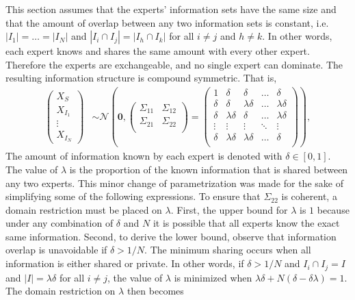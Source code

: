 \documentclass[11pt]{article}
\theoremstyle{definition}
\theoremstyle{definition}
\begin{document}
This section assumes that the experts' information sets have the same size and that the amount of overlap between any two information sets is constant, i.e.  $|I_{1}| =  \dots = |I_{N}|$ and $|I_{i} \cap I_{j}| = |I_{h} \cap I_{k}|$ for all $i \neq j$ and $h \neq k$. In other words, each expert knows and shares the same amount with every other expert. Therefore the experts are exchangeable, and no single expert can dominate. The resulting information structure is compound symmetric. That is,
\begin{align*}
\left(\begin{matrix} X_{S} \\ X_{I_1}\\ \vdots \\ X_{I_N} \end{matrix}\right) &\sim \mathcal{N}\left( 
 \boldsymbol{0}, \left(\begin{matrix} 
\Sigma_{11} & \Sigma_{12}\\
\Sigma_{21} & \Sigma_{22}\\
 \end{matrix}\right) 
 =
 \left(\begin{array}{c|cccc}
1 & \delta & \delta & \dots & \delta  \\ \hline
\delta & \delta &\lambda\delta & \dots & \lambda\delta   \\ 
\delta & \lambda\delta & \delta & \dots & \lambda\delta  \\ 
\vdots & \vdots & \vdots & \ddots & \vdots  \\ 
\delta & \lambda\delta & \lambda\delta & \dots & \delta\\ 
 \end{array}\right)\right),
\end{align*}
The amount of information known by each expert is denoted with $\delta \in [0,1]$. The value of $\lambda$ is the proportion of the known information that is shared between any two experts.  This minor change of parametrization was made for the sake of simplifying some of the following expressions. To ensure that $\Sigma_{22}$ is coherent, a domain restriction must be placed on $\lambda$. First, the upper bound for $\lambda$ is $1$ because under any combination of $\delta$ and $N$ it is possible that all experts know the exact same information. Second, to derive the lower bound, observe that information overlap is unavoidable if $\delta > 1/N$. The minimum sharing occurs when all information is either shared or private. In other words, if $\delta > 1/N$ and $I_{i} \cap I_j = I$ and $|I| =  \lambda \delta$ for all $i \neq j$, the value of $\lambda$ is minimized when $\lambda\delta + N(\delta - \delta\lambda) = 1$. The domain restriction on $\lambda$ then becomes
\end{document}
